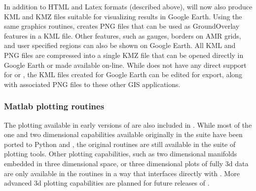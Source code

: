 In addition to HTML and Latex formats (described above), \vclaw will now also
produce KML and KMZ files suitable for visualizing results in Google Earth.
Using the same \mplotlib graphics routines, \vclaw creates PNG files
that can be used as GroundOverlay features in a KML file.  Other features, such
as gauges, borders on AMR grids, and user specified regions can also be
shown on Google Earth.  All KML and PNG files are compressed into a single
KMZ file  that can be opened directly in Google Earth or made available on-line.
While \vclaw does not have any direct support for \agis or \qgis,
the  KML files created for Google Earth can be edited for
export, along with associated PNG files to these other GIS applications.

\subsubsection{Matlab plotting routines}
The \mlab plotting available in early versions of \cpack are also included in
\vclaw.  While most of the one and two dimensional capabilities
available originally in the \mlab suite have been ported to Python and
\mplotlib, the original \mlab routines are still available in the \mlab suite of
plotting tools.  Other plotting capabilities, such as two dimensional
manifolds embedded in three dimensional space, or three dimensional
plots of fully 3d data are only available in the \mlab routines in a way that
interfaces directly with \clawpack.
More advanced 3d plotting capabilities are planned for future releases of \vclaw.
